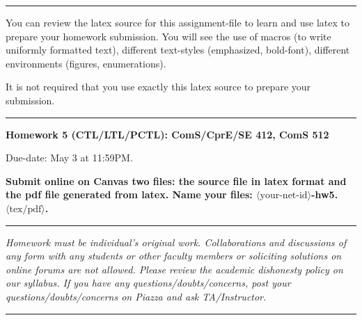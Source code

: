 \documentclass[11pt]{article}
\begin{document}
\hrule
\smallskip

\noindent

\noindent
You can review the latex source for this assignment-file to
learn and use latex to prepare your homework submission. You will see
the use of macros (to write uniformly formatted text), different
text-styles (emphasized, bold-font), different environments (figures,
enumerations).

It is not required that you use exactly this latex source to prepare
your submission. 
\smallskip
\hrule


\begin{center}
{\Large\bf Homework 5 (CTL/LTL/PCTL): ComS/CprE/SE 412, ComS 512}

\medskip

Due-date: May 3 at 11:59PM.

\medskip


\end{center}

\noindent
\textbf{
Submit online on Canvas two files: the source file in latex format and
the pdf file generated from latex. Name your files:
$\langle\mbox{your-net-id}\rangle$-hw5.$\langle\mbox{tex/pdf}\rangle$.
}

\hrule
\noindent
\smallskip

\emph{ Homework must be individual's original work. Collaborations and
  discussions of any form with any students or other faculty members
  or soliciting solutions on online forums are not allowed. Please
  review the academic dishonesty policy on our syllabus. If you have
  any questions/doubts/concerns, post your questions/doubts/concerns
  on Piazza and ask TA/Instructor.}

\smallskip
\hrule
\end{document}
